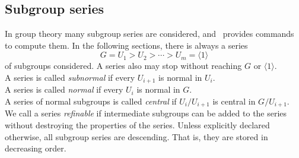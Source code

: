 \medskip

\subsection{Subgroup series\protect\footnotemark} 
In group theory many subgroup series are considered, and \gap\ provides commands to
compute them. 
In the following sections, there is always a series 
\[
G = U_1 > U_2 > \cdots > U_m = \langle 1 \rangle
\]
of subgroups considered.
A series also may stop without reaching $G$ or $\langle 1 \rangle$.\\[4pt] 
A series is called \emph{subnormal} if every $U_{i+1}$ is normal in $U_i$.\\[4pt] 
A series is called \emph{normal} if every $U_i$ is normal in $G$.\\[4pt] 
A series of normal subgroups is called \emph{central} if $U_i/U_{i+1}$ is central in 
$G/U_{i+1}$.\\[4pt] 
We call a series \emph{refinable} if intermediate subgroups can be added to the
series without destroying the properties of the series.
Unless explicitly declared otherwise, all subgroup series are descending. That is, they are stored in decreasing
order.

